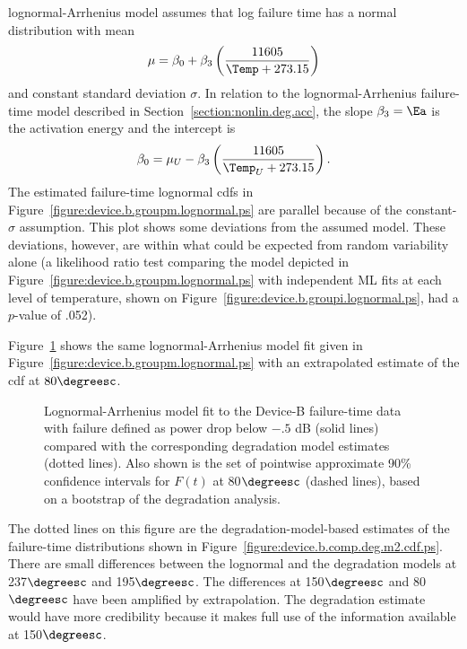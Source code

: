 lognormal-Arrhenius model assumes that log failure time has a normal
distribution with mean
\begin{displaymath}
\mu = \beta_{0} + \beta_{3} \left(\frac{11605}{\Temp+273.15}\right)
\end{displaymath}
and constant standard deviation $\sigma$.  In relation to
the lognormal-Arrhenius failure-time model described in
Section~\ref{section:nonlin.deg.acc}, the slope $\beta_{3}=\Ea$
is the activation energy and the intercept is
\begin{displaymath}
\beta_{0}= \mu_{U} - \beta_{3} \left(\frac{11605}{\Temp_{U}+273.15}\right).
\end{displaymath}
The estimated failure-time lognormal cdfs in
Figure~\ref{figure:device.b.groupm.lognormal.ps} are parallel because
of the constant-$\sigma$ assumption. This plot shows some
deviations from the assumed model. These deviations, however, are
within what could be expected from random variability alone (a
likelihood ratio test comparing the model depicted in
Figure~\ref{figure:device.b.groupm.lognormal.ps} with independent ML
fits at each level of temperature, shown on
Figure~\ref{figure:device.b.groupi.lognormal.ps}, had a $p$-value of
.052).

Figure~\ref{figure:device.b.salt.lognormal.comp.ps} shows the same
lognormal-Arrhenius model fit given in
Figure~\ref{figure:device.b.groupm.lognormal.ps} with an extrapolated
estimate of the cdf at $80\degreesc$. 
\begin{figure}
\caption{Lognormal-Arrhenius model fit to the Device-B failure-time
data with failure defined as power drop below $-.5$ dB (solid lines)
compared with the corresponding degradation model estimates (dotted
lines).  Also shown is the set of pointwise approximate 90\%
confidence intervals for $F(t)$ at 80$\degreesc$ (dashed lines), based
on a bootstrap of the degradation analysis.}
\label{figure:device.b.salt.lognormal.comp.ps}
\end{figure}
The dotted lines on this figure are the degradation-model-based
estimates of the failure-time distributions shown
in Figure~\ref{figure:device.b.comp.deg.m2.cdf.ps}.  There are small
differences between the lognormal and the degradation models at
237$\degreesc$ and 195$\degreesc$.  The differences at
150$\degreesc$ and 80$\degreesc$ have been amplified by
extrapolation. The degradation estimate would have more credibility
because it makes full use of the information available at
150$\degreesc$.

